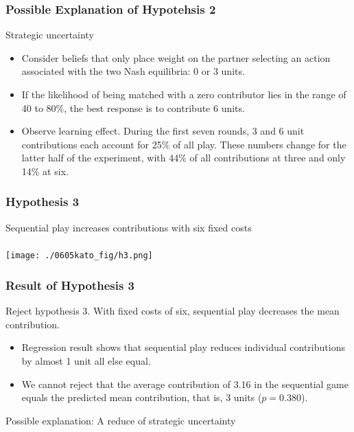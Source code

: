 \documentclass[unicode,12pt]{beamer}
\begin{document}
    \begin{frame}
        \frametitle{Possible Explanation of Hypotehsis 2}
    
        Strategic uncertainty
        \begin{itemize}
            \item Consider beliefs that only place weight on the partner selecting an action associated with the two Nash equilibria: 0 or 3 units.
            \item If the likelihood of being matched with a zero contributor lies in the range of 40 to 80\%, the best response is to contribute 6 units.
            \item Observe learning effect. During the first seven rounds, 3 and 6 unit contributions each account for 25\% of all play. These numbers change for the latter half of the experiment, with 44\% of all contributions at three and only 14\% at six.
        \end{itemize}
    
    \end{frame}

    \begin{frame}
        \frametitle{Hypothesis 3}
    
        Sequential play increases contributions with six fixed costs
    
    \end{frame}

    \begin{frame}
        \frametitle{}
    
        \centerline{\texttt{[image: ./0605kato\_fig/h3.png]}}
    
    \end{frame}

    \begin{frame}
        \frametitle{Result of Hypothesis 3}
    
        Reject hypothesis 3. With fixed costs of six, sequential play decreases the mean contribution.
        \begin{itemize}
            \item Regression result shows that sequential play reduces individual contributions by almost 1 unit all else equal.
            \item We cannot reject that the average contribution of 3.16 in the sequential game equals the predicted mean contribution, that is, 3 units ($p = 0.380$).
        \end{itemize}
        Possible explanation: A reduce of strategic uncertainty
    
    \end{frame}
\end{document}
